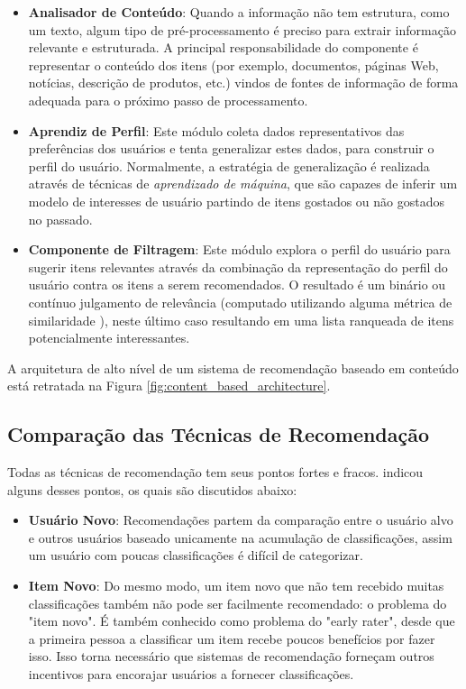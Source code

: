\begin{itemize}
	\item{\textbf{Analisador de Conteúdo}: Quando a informação não tem estrutura, como um texto, algum tipo de pré-processamento é preciso para extrair informação relevante e estruturada. A principal responsabilidade do componente é representar o conteúdo dos itens (por exemplo, documentos, páginas Web, notícias, descrição de produtos, etc.) vindos de fontes de informação de forma adequada para o próximo passo de processamento.}
	
	\item{\textbf{Aprendiz de Perfil}: Este módulo coleta dados representativos das preferências dos usuários e tenta generalizar estes dados, para construir o perfil do usuário. Normalmente, a estratégia de generalização é realizada através de técnicas de \textit{aprendizado de máquina}, que são capazes de inferir um modelo de interesses de usuário partindo de itens gostados ou não gostados no passado.}
	
	\item{\textbf{Componente de Filtragem}: Este módulo explora o perfil do usuário para sugerir itens relevantes através da combinação da representação do perfil do usuário contra os itens a serem recomendados. O resultado é um binário ou contínuo julgamento de relevância (computado utilizando alguma métrica de similaridade \citep{Herlocker:2004:ECF:963770.963772}), neste último caso resultando em uma lista ranqueada de itens potencialmente interessantes.}
\end{itemize}

A arquitetura de alto nível de um sistema de recomendação baseado em conteúdo está retratada na Figura \ref{fig:content_based_architecture}.


\subsection{Comparação das Técnicas de Recomendação}

Todas as técnicas de recomendação tem seus pontos fortes e fracos. \cite{Burke:2002:HRS:586321.586352} indicou alguns desses pontos, os quais são discutidos abaixo:

\begin{itemize}
	\item{\textbf{Usuário Novo}: Recomendações partem da comparação entre o usuário alvo e outros usuários baseado unicamente na acumulação de classificações, assim um usuário com poucas classificações é difícil de categorizar.}
	
	\item{\textbf{Item Novo}: Do mesmo modo, um item novo que não tem recebido muitas classificações também não pode ser facilmente recomendado: o problema do "item novo". É também conhecido como problema do "early rater", desde que a primeira pessoa a classificar um item recebe poucos benefícios por fazer isso. Isso torna necessário que sistemas de recomendação forneçam outros incentivos para encorajar usuários a fornecer classificações.}
\end{itemize}

